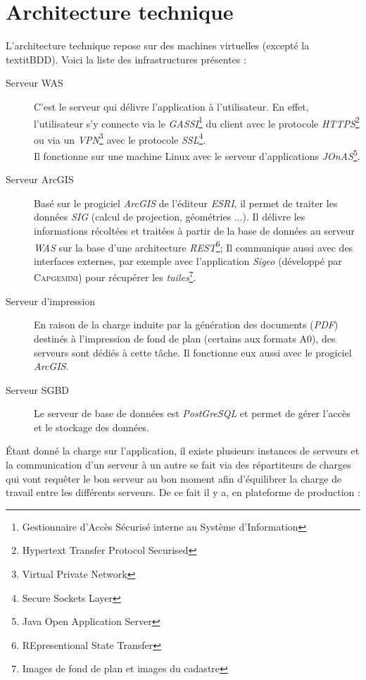 \section{Architecture technique}
L'architecture technique repose sur des machines virtuelles (excepté la textit{BDD}).
Voici la liste des infrastructures présentes :
\begin{description}
\item[Serveur WAS] C'est le serveur qui délivre l'application à l'utilisateur. En effet, l'utilisateur s'y connecte via le \textit{GASSI}\footnote{Gestionnaire d'Accès Sécurisé interne au Système d'Information} du client avec le protocole \textit{HTTPS}\footnote{Hypertext Transfer Protocol Securised} ou via un \textit{VPN}\footnote{Virtual Private Network} avec le protocole \textit{SSL}\footnote{Secure Sockets Layer}.
\\Il fonctionne sur une machine Linux avec le serveur d'applications \textit{JOnAS}\footnote{Java Open Application Server}.
\item[Serveur ArcGIS] Basé sur le progiciel \textit{ArcGIS} de l'éditeur \textit{ESRI}, il permet de traiter les données \textit{SIG} (calcul de projection, géométries ...). Il délivre les informations récoltées et traitées à partir de la base de données au serveur \textit{WAS} sur la base d'une architecture \textit{REST}\footnote{REpresentional State Transfer}; Il communique aussi avec des interfaces externes, par exemple avec l'application \textit{Sigeo} (développé par \textsc{Capgemini}) pour récupérer les \textit{tuiles}\footnote{Images de fond de plan et images du cadastre}.
\item[Serveur d'impression] En raison de la charge induite par la génération des documents (\textit{PDF}) destinés à l'impression de fond de plan (certains aux formats A0), des serveurs sont dédiés à cette tâche. Il fonctionne eux aussi avec le progiciel \textit{ArcGIS}.
\item[Serveur SGBD] Le serveur de base de données est \textit{PostGreSQL} et permet de gérer l'accès et le stockage des données.\\
\end{description}

\'Etant donné la charge sur l'application, il existe plusieurs instances de serveurs et la communication d'un serveur à un autre se fait via des répartiteurs de charges qui vont requêter le bon serveur au bon moment afin d'équilibrer la charge de travail entre les différents serveurs. De ce fait il y a, en plateforme de production :\\

